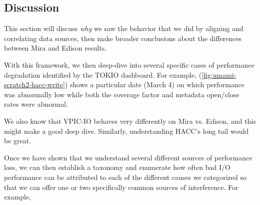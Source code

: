 \documentclass[conference,10pt,compsocconf]{IEEEtran}
\begin{document}
\subsection{Discussion} \label{sec:results/discussion}

This section will discuss \emph{why} we saw the behavior that we did by
aligning and correlating data sources, then make broader conclusions about the
differences between Mira and Edison results.


With this framework, we then deep-dive into several specific cases of
performance degradation identified by the TOKIO dashboard.  For example,
(\ref{fig:umami-scratch2-hacc-write}) shows a particular date (March 4) on
which performance was abnormally low while both the coverage factor and metadata
open/close rates were abnormal.

We also know that VPIC-IO behaves very differently on Mira vs. Edison, and this
might make a good deep dive.  Similarly, understanding HACC's long tail would
be great.

Once we have shown that we understand several different sources of performance
loss, we can then establish a taxonomy and enumerate how often bad I/O
performance can be attributed to each of the different causes we categorized so
that we can offer one or two specifically common sources of interference.  For
example,
\end{document}
